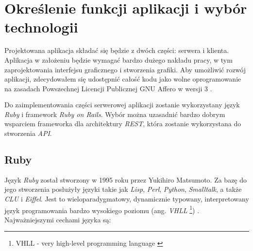\documentclass[a4paper,12pt]{article}
\begin{document}
\clearpage

\section{Określenie funkcji aplikacji i wybór technologii}
Projektowana aplikacja składać się będzie z dwóch części: serwera i
klienta. Aplikacja w założeniu będzie wymagać bardzo dużego nakładu
pracy, w tym zaprojektowania interfejsu graficznego i stworzenia
grafiki. Aby umożliwić rozwój aplikacji, zdecydowałem się udostępnić
całość kodu jako wolne oprogramowanie na zasadach Powszechnej Licencji
Publicznej GNU Affero w wersji 3 \cite{affero}.

Do zaimplementowania części serwerowej aplikacji zostanie wykorzystany
język \emph{Ruby} i framework \emph{Ruby on Rails}. Wybór można
uzasadnić bardzo dobrym wsparciem frameworka dla architektury
\emph{REST}, która zostanie wykorzystana do stworzenia \emph{API}.

\subsection{Ruby}
Język \emph{Ruby} został stworzony w 1995 roku przez Yukihiro
Matsumoto. Za bazę do jego stworzenia posłużyły języki takie jak
\emph{Lisp}, \emph{Perl}, \emph{Python}, \emph{Smalltalk}, a także
\emph{CLU} i \emph{Eiffel}. Jest to wieloparadygmatowy, dynamicznie
typowany, interpretowany język programowania bardzo wysokiego poziomu
(ang. \emph{VHLL} \footnote{VHLL - very high-level programming language
  \cite{vhll} }) \cite{ruby}. Najważniejszymi cechami języka są:
\end{document}
